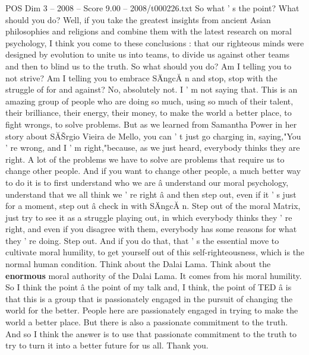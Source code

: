 \begin{textsample}{POS Dim 3 – 2008 – Score 9.00 – 2008/t000226.txt}
So what ' s the point?
What should you do?
Well, if you take the greatest insights from ancient Asian philosophies and religions and combine them with the latest research on moral psychology, I think you come to these conclusions : that our righteous minds were designed by evolution to unite us into teams, to divide us against other teams and then to blind us to the truth.
So what should you do?
Am I telling you to not strive?
Am I telling you to embrace SÄngcĂ n and stop, stop with the struggle of for and against?
No, absolutely not.
I ' m not saying that.
This is an amazing group of people who are doing so much, using so much of their talent, their brilliance, their energy, their money, to make the world a better place, to fight wrongs, to solve problems.
But as we learned from Samantha Power in her story about SĂŠrgio Vieira de Mello, you can ' t just go charging in, saying,"You ' re wrong, and I ' m right,"because, as we just heard, everybody thinks they are right.
A lot of the problems we have to solve are problems that require us to change other people.
And if you want to change other people, a much better way to do it is to first understand who we are â understand our moral psychology, understand that we all think we ' re right â and then step out, even if it ' s just for a moment, step out â check in with SÄngcĂ n.
Step out of the moral Matrix, just try to see it as a struggle playing out, in which everybody thinks they ' re right, and even if you disagree with them, everybody has some reasons for what they ' re doing.
Step out.
And if you do that, that ' s the essential move to cultivate moral humility, to get yourself out of this self-righteousness, which is the normal human condition.
Think about the Dalai Lama.
Think about the \textbf{enormous} moral authority of the Dalai Lama.
It comes from his moral humility.
So I think the point â the point of my talk and, I think, the point of TED â is that this is a group that is passionately engaged in the pursuit of changing the world for the better.
People here are passionately engaged in trying to make the world a better place.
But there is also a passionate commitment to the truth.
And so I think the answer is to use that passionate commitment to the truth to try to turn it into a better future for us all.
Thank you.

\end{textsample}
